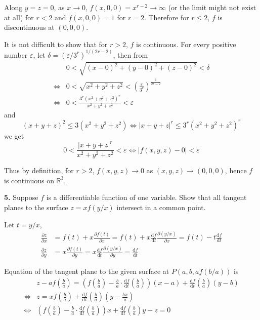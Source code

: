 \documentclass[a4paper,12pt]{article}
\newcommand{\tho}[3][]{\frac{\partial #1 #2}{\partial #3 #1}}
\newcommand{\leibniz}[3][]{\frac{\mathrm{d} #1 #2}{\mathrm{d} #3 #1}}
\newcommand{\exercise}[1]{\noindent\textbf{#1.}}
\begin{document}
Along $y = z = 0$, as $x \to 0$, $f(x, 0, 0) = x^{r-2} \to \infty$
(or the limit might not exist at all) for $r < 2$
and $f(x, 0, 0) = 1$ for $r = 2$.
Therefore for $r \leq 2$, $f$ is discontinuous at $(0, 0, 0)$.

It is not difficult to show that for $r > 2$, $f$ is continuous.
For every positive number $\varepsilon$,
let $\delta = (\varepsilon/3^r)^{1/(2r-2)}$, then from
\begin{align*}
  &0 < \sqrt{(x-0)^2 + (y-0)^2 + (z-0)^2} < \delta\\
  \iff &0 < \sqrt{x^2 + y^2 + z^2}
          < \left(\frac{\varepsilon}{3^r}\right)^\frac{1}{2r-2}\\
  \iff &0 < \frac{3^r(x^2 + y^2 + z^2)^r}{x^2 + y^2 + z^2} < \varepsilon
\end{align*}
and
\[(x + y + z)^2 \leq 3(x^2 + y^2 + z^2)
\iff |x + y + z|^r \leq 3^r(x^2 + y^2 + z^2)^r\]
we get
\[0 < \frac{|x + y + z|^r}{x^2 + y^2 + z^2} < \varepsilon
\iff |f(x, y, z) - 0| < \varepsilon\]

Thus by definition, for $r > 2$, $f(x, y, z) \to 0$ as $(x, y, z)\to(0, 0, 0)$,
hence $f$ is continuous on $\mathbb{R}^3$.

\exercise{5} Suppose $f$ is a differentiable function of one variable.
Show that all tangent planes to the surface $z = xf(y/x)$
intersect in a common point.

Let $t = y/x$,
\begin{align*}
\tho{z}{x} &= f(t) + x\tho{f(t)}{x}
            = f(t) + x\leibniz{f}{t}\tho{(y/x)}{x}
            = f(t) - t\leibniz{f}{t}\\
\tho{z}{y} &= x\tho{f(t)}{y}
            = x\leibniz{f}{t}\tho{(y/x)}{y}
            = \leibniz{f}{t}
\end{align*}

Equation of the tangent plane to the given surface at $P(a, b, af(b/a))$ is
\begin{align*}
     &z - af\left(\frac{b}{a}\right) = \left(f\left(\frac{b}{a}\right)
        - \frac{b}{a}\cdot\leibniz{f}{t}\left(\frac{b}{a}\right)\right)(x - a)
        + \leibniz{f}{t}\left(\frac{b}{a}\right)(y - b)\\
\iff &z = xf\left(\frac{b}{a}\right) + \leibniz{f}{t}\left(\frac{b}{a}\right)
          \left(y - \frac{bx}{a}\right)\\
\iff &\left(f\left(\frac{b}{a}\right)
            - \frac{b}{a}\cdot\leibniz{f}{t}\left(\frac{b}{a}\right)\right)x
      + \leibniz{f}{t}\left(\frac{b}{a}\right)y - z = 0
\end{align*}
\end{document}
